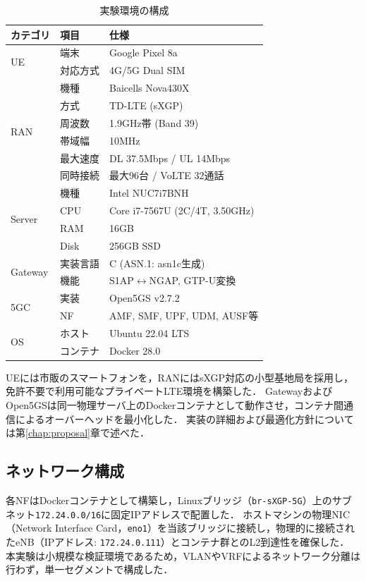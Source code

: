 \begin{table}[htbp]
\centering
\caption{実験環境の構成}
\label{tab:experiment_env}
\small
\begin{tabular}{|l|l|l|}
\hline
\textbf{カテゴリ} & \textbf{項目} & \textbf{仕様} \\
\hline
\hline
\multirow{2}{*}{UE} & 端末 & Google Pixel 8a \\
& 対応方式 & 4G/5G Dual SIM \\
\hline
\multirow{6}{*}{RAN} & 機種 & Baicells Nova430X \\
& 方式 & TD-LTE (sXGP) \\
& 周波数 & 1.9GHz帯 (Band 39) \\
& 帯域幅 & 10MHz \\
& 最大速度 & DL 37.5Mbps / UL 14Mbps \\
& 同時接続 & 最大96台 / VoLTE 32通話 \\
\hline
\multirow{4}{*}{Server} & 機種 & Intel NUC7i7BNH \\
& CPU & Core i7-7567U (2C/4T, 3.50GHz) \\
& RAM & 16GB \\
& Disk & 256GB SSD \\
\hline
\hline
\multirow{2}{*}{Gateway} & 実装言語 & C (ASN.1: asn1c生成) \\
& 機能 & S1AP$\leftrightarrow$NGAP, GTP-U変換 \\
\hline
\multirow{2}{*}{5GC} & 実装 & Open5GS v2.7.2 \\
& NF & AMF, SMF, UPF, UDM, AUSF等 \\
\hline
\multirow{2}{*}{OS} & ホスト & Ubuntu 22.04 LTS \\
& コンテナ & Docker 28.0 \\
\hline
\end{tabular}
\end{table}

UEには市販のスマートフォンを，RANにはsXGP対応の小型基地局を採用し，免許不要で利用可能なプライベートLTE環境を構築した．
GatewayおよびOpen5GSは同一物理サーバ上のDockerコンテナとして動作させ，コンテナ間通信によるオーバーヘッドを最小化した．
実装の詳細および最適化方針については第\ref{chap:proposal}章で述べた．

\subsection{ネットワーク構成}
各NFはDockerコンテナとして構築し，Linuxブリッジ（\texttt{br-sXGP-5G}）上のサブネット\texttt{172.24.0.0/16}に固定IPアドレスで配置した．
ホストマシンの物理NIC（Network Interface Card，\texttt{eno1}）を当該ブリッジに接続し，物理的に接続されたeNB（IPアドレス: \texttt{172.24.0.111}）とコンテナ群とのL2到達性を確保した．
本実験は小規模な検証環境であるため，VLANやVRFによるネットワーク分離は行わず，単一セグメントで構成した．

